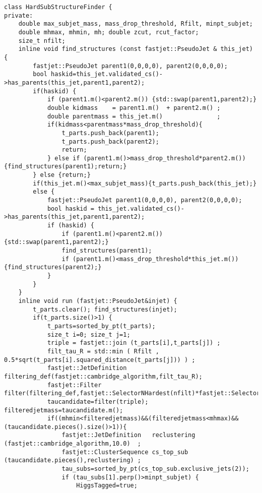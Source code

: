 \documentclass[12pt,a3paper,titlepage]{article}
\begin{document}
	\thispagestyle{empty}
	\begin{lstlisting}[style=CStyle]
class HardSubStructureFinder {
private:
    double max_subjet_mass, mass_drop_threshold, Rfilt, minpt_subjet;
    double mhmax, mhmin, mh; double zcut, rcut_factor;
    size_t nfilt;
    inline void find_structures (const fastjet::PseudoJet & this_jet) {
        fastjet::PseudoJet parent1(0,0,0,0), parent2(0,0,0,0);
        bool haskid=this_jet.validated_cs()->has_parents(this_jet,parent1,parent2);
        if(haskid) {
            if (parent1.m()<parent2.m()) {std::swap(parent1,parent2);}
            double kidmass    = parent1.m()  + parent2.m() ;
            double parentmass = this_jet.m()               ;
            if(kidmass<parentmass*mass_drop_threshold){
                t_parts.push_back(parent1);
                t_parts.push_back(parent2);
                return;
            } else if (parent1.m()>mass_drop_threshold*parent2.m()) {find_structures(parent1);return;}
        } else {return;}
        if(this_jet.m()<max_subjet_mass){t_parts.push_back(this_jet);}
        else {
            fastjet::PseudoJet parent1(0,0,0,0), parent2(0,0,0,0);
            bool haskid = this_jet.validated_cs()->has_parents(this_jet,parent1,parent2);
            if (haskid) {
                if (parent1.m()<parent2.m()) {std::swap(parent1,parent2);}
                find_structures(parent1);
                if (parent1.m()<mass_drop_threshold*this_jet.m()) {find_structures(parent2);}
            }
        }
    }
    inline void run (fastjet::PseudoJet&injet) {
        t_parts.clear(); find_structures(injet);
        if(t_parts.size()>1) {
            t_parts=sorted_by_pt(t_parts);
            size_t i=0; size_t j=1;
            triple = fastjet::join (t_parts[i],t_parts[j]) ;
            filt_tau_R = std::min ( Rfilt , 0.5*sqrt(t_parts[i].squared_distance(t_parts[j])) ) ;
            fastjet::JetDefinition filtering_def(fastjet::cambridge_algorithm,filt_tau_R);
            fastjet::Filter filter(filtering_def,fastjet::SelectorNHardest(nfilt)*fastjet::SelectorPtMin(minpt_subjet));
            taucandidate=filter(triple); filteredjetmass=taucandidate.m();
            if((mhmin<filteredjetmass)&&(filteredjetmass<mhmax)&&(taucandidate.pieces().size()>1)){
                fastjet::JetDefinition   reclustering (fastjet::cambridge_algorithm,10.0)  ;
                fastjet::ClusterSequence cs_top_sub   (taucandidate.pieces(),reclustering) ;
                tau_subs=sorted_by_pt(cs_top_sub.exclusive_jets(2));
                if (tau_subs[1].perp()>minpt_subjet) {
                    HiggsTagged=true;

\end{lstlisting}
\end{document}
